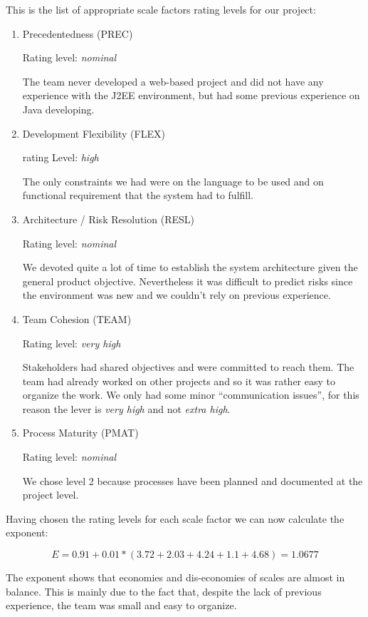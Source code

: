 \documentclass[10pt,a4paper,titlepage]{article}
\begin{document}
\vspace{10pt}
This is the list of appropriate scale factors rating levels for our project:
\begin{enumerate}
\item Precedentedness (PREC)

Rating level: \textit{nominal}

The team never developed a web-based project and did not have any experience with the J2EE environment, but had some previous experience on Java developing.

\item Development Flexibility (FLEX)

rating Level: \textit{high}

The only constraints we had were on the language to be used and on functional requirement that the system had to fulfill. 

\item Architecture / Risk Resolution (RESL)

Rating level: \textit{nominal}

We devoted quite a lot of time to establish the system architecture given the general product objective. Nevertheless it was difficult to predict risks since the environment was new and we couldn't rely on previous experience.

\item Team Cohesion (TEAM)

Rating level: \textit{very high}

Stakeholders had shared objectives and were committed to reach them. The team had already worked on other projects and so it was rather easy to organize the work. We only had some minor ``communication issues'', for this reason the lever is \textit{very high} and not \textit{extra high}.

\item Process Maturity (PMAT)

Rating level: \textit{nominal}

We chose level 2 because processes have been planned and documented at the project level.
\end{enumerate}

Having chosen the rating levels for each scale factor we can now calculate the exponent:

\[E=0.91+0.01*(3.72+2.03+4.24+1.1+4.68)=1.0677\]

The exponent shows that economies and dis-economies of scales are almost in balance. This is mainly due to the fact that, despite the lack of previous experience, the team was small and easy to organize.
\end{document}
